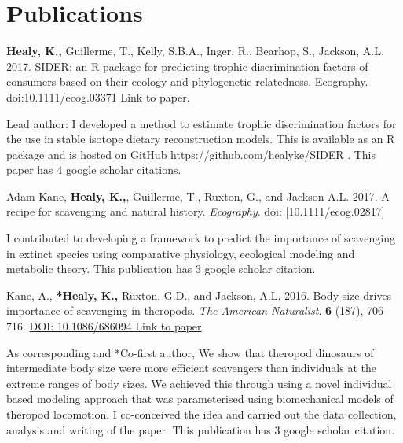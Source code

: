 \documentclass[10pt,a4paper]{article}
\begin{document}
\bigskip


\section{Publications}
\begin{flushleft}


\setlength{\parindent}{0mm}\textbf{Healy, K.,} Guillerme, T., Kelly, S.B.A., Inger, R., Bearhop, S., Jackson, A.L. 2017. SIDER: an R package for predicting trophic discrimination factors of consumers based on their ecology and phylogenetic relatedness. Ecography. {doi:10.1111/ecog.03371 Link to paper}.
\smallskip
\par{\fontsize{10.5}{10} Lead author: I developed a method to estimate trophic discrimination factors for the use in stable isotope dietary reconstruction models. This is available as an R package and is hosted on GitHub https://github.com/healyke/SIDER . This paper has 4 google scholar citations.}

\bigskip

\setlength{\parindent}{0mm} Adam Kane, \textbf{Healy, K.,}, Guillerme, T., Ruxton, G., and Jackson A.L. 2017. A recipe for scavenging and natural history. \textit{Ecography}. doi: [10.1111/ecog.02817]
\smallskip
\par{\fontsize{10.5}{10} I contributed to developing a framework to predict the importance of scavenging in extinct species using comparative physiology, ecological modeling and metabolic theory. This publication has 3 google scholar citation.}

\bigskip

\setlength{\parindent}{0mm}Kane, A., \textbf{*Healy, K.,} Ruxton, G.D., and Jackson, A.L. 2016. Body size drives importance of scavenging in theropods. \textit{The American Naturalist}. \textbf{6} (187), 706-716. \href{https://www.researchgate.net/profile/Kevin_Healy/publication/301279301_Body_Size_as_a_Driver_of_Scavenging_in_Theropod_Dinosaurs/links/570f8b2a08ae38897ba19c35.pdf.}{DOI: 10.1086/686094 Link to paper}
\smallskip
\par{\fontsize{10.5}{10} As corresponding and *Co-first author, We show that theropod dinosaurs of intermediate body size were more efficient scavengers than individuals at the extreme ranges of body sizes. We achieved this through using a novel individual based modeling approach that was parameterised using biomechanical models of theropod locomotion. I co-conceived the idea and carried out the data collection, analysis and writing of the paper. This publication has 3 google scholar citation.}


\end{flushleft}
\end{document}
